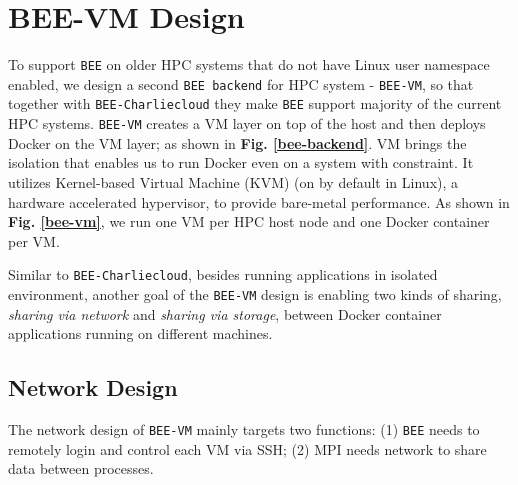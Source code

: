 \section{BEE-VM Design}
\label{bee-vm-section}

To support \texttt{BEE} on older HPC systems that do not have Linux user namespace enabled, we design a second \texttt{BEE backend} for HPC system - \texttt{BEE-VM}, so that together with \texttt{BEE-Charliecloud} they make \texttt{BEE} support majority of the current HPC systems.
\texttt{BEE-VM} creates a VM layer on top of the host and then deploys Docker on the VM layer; as shown in \textbf{Fig. \ref{bee-backend}}. VM brings the isolation that enables us to run Docker even on a system with constraint. It utilizes Kernel-based Virtual Machine (KVM) (on by default in Linux), a hardware accelerated hypervisor, to provide bare-metal performance. As shown in \textbf{Fig. \ref{bee-vm}}, we run one VM per HPC host node and one Docker container per VM.


Similar to \texttt{BEE-Charliecloud}, besides running applications in isolated environment, another goal of the \texttt{BEE-VM} design is enabling two kinds of sharing, \textit{sharing via network} and \textit{sharing via storage}, between Docker container applications running on different machines. 
 
\subsection{Network Design}
The network design of \texttt{BEE-VM} mainly targets two functions: (1) \texttt{BEE} needs to remotely login and control each VM via SSH; (2) MPI needs network to share data between processes. 

